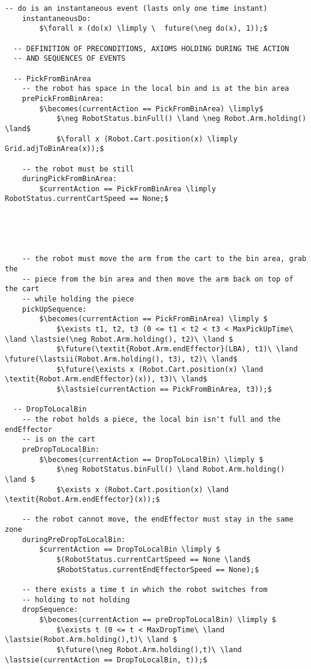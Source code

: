\begin{lstlisting}[fontadjust, mathescape, frame=single]
    -- do is an instantaneous event (lasts only one time instant)
    instantaneousDo:
        $\forall x (do(x) \limply \  future(\neg do(x), 1));$

  -- DEFINITION OF PRECONDITIONS, AXIOMS HOLDING DURING THE ACTION 
  -- AND SEQUENCES OF EVENTS

  -- PickFromBinArea
    -- the robot has space in the local bin and is at the bin area
    prePickFromBinArea:
        $\becomes(currentAction == PickFromBinArea) \limply$
            $\neg RobotStatus.binFull() \land \neg Robot.Arm.holding() \land$
            $\forall x (Robot.Cart.position(x) \limply Grid.adjToBinArea(x));$

    -- the robot must be still
    duringPickFromBinArea:
        $currentAction == PickFromBinArea \limply RobotStatus.currentCartSpeed == None;$





    -- the robot must move the arm from the cart to the bin area, grab the 
    -- piece from the bin area and then move the arm back on top of the cart 
    -- while holding the piece
    pickUpSequence:
        $\becomes(currentAction == PickFromBinArea) \limply $
            $\exists t1, t2, t3 (0 <= t1 < t2 < t3 < MaxPickUpTime\ \land \lastsie(\neg Robot.Arm.holding(), t2)\ \land $
            $\future(\textit{Robot.Arm.endEffector}(LBA), t1)\ \land \future(\lastsii(Robot.Arm.holding(), t3), t2)\ \land$
            $\future(\exists x (Robot.Cart.position(x) \land \textit{Robot.Arm.endEffector}(x)), t3)\ \land$
            $\lastsie(currentAction == PickFromBinArea, t3));$
      
  -- DropToLocalBin
    -- the robot holds a piece, the local bin isn't full and the endEffector 
    -- is on the cart
    preDropToLocalBin:
        $\becomes(currentAction == DropToLocalBin) \limply $
            $\neg RobotStatus.binFull() \land Robot.Arm.holding() \land $
            $\exists x (Robot.Cart.position(x) \land \textit{Robot.Arm.endEffector}(x));$
    
    -- the robot cannot move, the endEffector must stay in the same zone
    duringPreDropToLocalBin:
        $currentAction == DropToLocalBin \limply $
            $(RobotStatus.currentCartSpeed == None \land$
            $RobotStatus.currentEndEffectorSpeed == None);$
  
    -- there exists a time t in which the robot switches from 
    -- holding to not holding
    dropSequence:
        $\becomes(currentAction == preDropToLocalBin) \limply $
            $\exists t (0 <= t < MaxDropTime\ \land \lastsie(Robot.Arm.holding(),t)\ \land $
            $\future(\neg Robot.Arm.holding(),t)\ \land \lastsie(currentAction == DropToLocalBin, t));$
  

\end{lstlisting}

